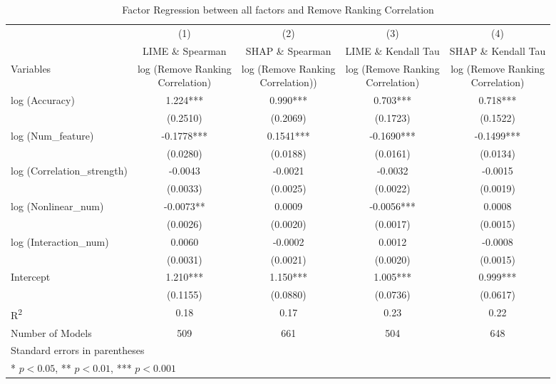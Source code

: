 \documentclass[mnsc,blindrev]{informs3}
\begin{document}
\begin{landscape}
\begin{table}[H]
\centering
\caption{Factor Regression between all factors and Remove Ranking Correlation}
\begin{tabular}{lcccc}
\toprule
 & (1) & (2) & (3) & (4) \\
 & LIME \& Spearman & SHAP \& Spearman & LIME \& Kendall Tau & SHAP \& Kendall Tau \\

Variables & \makecell{log (Remove Ranking \\Correlation)} & \makecell{log (Remove Ranking \\Correlation)}) & \makecell{log (Remove Ranking \\Correlation)} & \makecell{log (Remove Ranking \\Correlation)} \\
\midrule
log (Accuracy) & 1.224*** & 0.990*** & 0.703*** & 0.718*** \\
 & (0.2510) & (0.2069) & (0.1723) & (0.1522) \\
log (Num\_feature) & -0.1778*** & 0.1541*** & -0.1690*** & -0.1499*** \\
 & (0.0280) & (0.0188) & (0.0161) & (0.0134) \\
log (Correlation\_strength) & -0.0043 & -0.0021 & -0.0032 & -0.0015 \\
 & (0.0033) & (0.0025) & (0.0022) & (0.0019) \\
log (Nonlinear\_num) & -0.0073** & 0.0009 & -0.0056*** & 0.0008 \\
 & (0.0026) & (0.0020) & (0.0017) & (0.0015) \\
log (Interaction\_num) & 0.0060 & -0.0002 & 0.0012 & -0.0008 \\
 & (0.0031) & (0.0021) & (0.0020) & (0.0015) \\
Intercept & 1.210*** & 1.150*** & 1.005*** & 0.999*** \\
 & (0.1155) & (0.0880) & (0.0736) & (0.0617) \\
\midrule
R\textsuperscript{2} & 0.18 & 0.17 & 0.23 & 0.22 \\
Number of Models & 509 & 661 & 504 & 648 \\
\bottomrule
\multicolumn{5}{l}{Standard errors in parentheses} \\
\multicolumn{5}{l}{* $p<0.05$, ** $p<0.01$, *** $p<0.001$} \\
\end{tabular}
\end{table}
\end{landscape}
\end{document}
